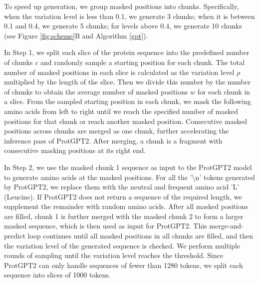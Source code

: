 \documentclass{article}
\begin{document}
To speed up generation, we group masked positions into chunks. Specifically, when the variation level is less than 0.1, we generate 3 chunks; when it is between 0.1 and 0.4, we generate 5 chunks; for levels above 0.4, we generate 10 chunks (see Figure \ref{fig:scheme}B and Algorithm \ref{gpt}). 

In Step 1, we split each slice of the protein sequence into the predefined number of chunks $c$ and randomly sample a starting position for each chunk. The total number of masked positions in each slice is calculated as the variation level $\rho$ multiplied by the length of the slice. Then we divide this number by the number of chunks to obtain the average number of masked positions $w$ for each chunk in a slice. From the sampled starting position in each chunk, we mask the following amino acids from left to right until we reach the specified number of masked positions for that chunk or reach another masked position. Consecutive masked positions across chunks are merged as one chunk, further accelerating the inference pass of ProtGPT2. After merging, a chunk is a fragment with consecutive masking positions at its right end.

In Step 2, we use the masked chunk 1 sequence as input to the ProtGPT2 model to generate amino acids at the masked positions. For all the '\textbackslash n' tokens generated by ProtGPT2, we replace them with the neutral and frequent amino acid 'L' (Leucine). If ProtGPT2 does not return a sequence of the required length, we supplement the remainder with random amino acids. After all masked positions are filled, chunk 1 is further merged with the masked chunk 2 to form a larger masked sequence, which is then used as input for ProtGPT2. This merge-and-predict loop continues until all masked positions in all chunks are filled, and then the variation level of the generated sequence is checked. We perform multiple rounds of sampling until the variation level reaches the threshold. Since ProtGPT2 can only handle sequences of fewer than 1280 tokens, we split each sequence into slices of 1000 tokens.
\end{document}
